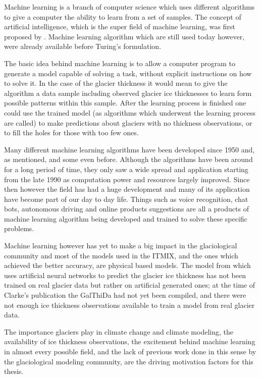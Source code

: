 Machine learning is a branch of computer science which uses different algorithms to give a computer the ability to learn from a set of samples. The concept of artificial intelligence, which is the super field of machine learning, was first proposed by \citet{Turing1950}. Machine learning algorithm which are still used today however, were already available before Turing's formulation.

The basic idea behind machine learning is to allow a computer program to generate a model capable of solving a task, without explicit instructions on how to solve it. In the case of the glacier thickness it would mean to give the algorithm a data sample including observed glacier ice thicknesses to learn form possible patterns within this sample. After the learning process is finished one could use the trained model (as algorithms which underwent the learning process are called) to make predictions about glaciers with no thickness observations, or to fill the holes for those with too few ones.

Many different machine learning algorithms have been developed since 1950 and, as mentioned, and some even before. Although the algorithms have been around for a long period of time, they only saw a wide spread and application starting from the late 1990 as computation power and resources largely improved. Since then however the field has had a huge development and many of its application have become part of our day to day life. Things such as voice recognition, chat bots, autonomous driving and online products suggestions are all a products of machine learning algorithm being developed and trained to solve these specific problems.

Machine learning however has yet to make a big impact in the glaciological community and most of the models used in the ITMIX, and the ones which achieved the better accuracy, are physical based models. The model from \citet{Clarke2009} which uses artificial neural networks to predict the glacier ice thickness has not been trained on real glacier data but rather on artificial generated ones; at the time of Clarke's publication the GalThiDa had not yet been compiled, and there were not enough ice thickness observations available to train a model from real glacier data.

The importance glaciers play in climate change and climate modeling, the availability of ice thickness observations, the excitement behind machine learning in almost every possible field, and the lack of previous work done in this sense by the glaciological modeling community, are the driving motivation factors for this thesis.

